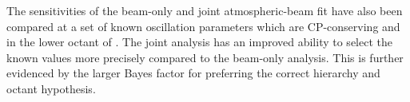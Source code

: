 \begin{table}[ht!]
  \centering
  \begingroup
  \renewcommand{\arraystretch}{1.5}
  \caption{}
  \label{tab:Conclusion_Summary}
  \endgroup
\end{table}

The sensitivities of the beam-only and joint atmospheric-beam fit have also been compared at a set of known oscillation parameters which are CP-conserving and in the lower octant of . The joint analysis has an  improved ability to select the known values more precisely compared to the beam-only analysis. This is further evidenced by the larger Bayes factor for preferring the correct hierarchy and octant hypothesis. 

